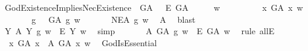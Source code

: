 \begin{isabellebody}
\isamarkupfalse%
\ GodExistenceImpliesNecExistence{\isacharcolon}\ {\isachardoublequoteopen}{\isasymlfloor}\isactrlbold {\isasymexists}\ G\isactrlsup A\ \isactrlbold {\isasymrightarrow}\ \ \isactrlbold {\isasymbox}\isactrlbold {\isasymexists}\isactrlsup E\ G\isactrlsup A{\isasymrfloor}{\isachardoublequoteclose}\isanewline
%
\isadelimproof
%
\endisadelimproof
%
\isatagproof
{}\isamarkupfalse%
\ {\isacharminus}\isanewline
\isacommand{{\isacharbraceleft}}\isamarkupfalse%
\isanewline
\ \ \isamarkupfalse%
\ w\ \isanewline
\ \ \isacommand{{\isacharbraceleft}}\isamarkupfalse%
\isanewline
\ \ \ \ \isamarkupfalse%
\ {\isachardoublequoteopen}{\isasymexists}x{\isachardot}\ G\isactrlsup A\ x\ w{\isachardoublequoteclose}\isanewline
\ \ \ \ \isamarkupfalse%
\ \isamarkupfalse%
\ g\ \ {}{\isacharcolon}\ {\isachardoublequoteopen}G\isactrlsup A\ g\ w{\isachardoublequoteclose}\ \isacommand{{\isachardot}{\isachardot}}\isamarkupfalse%
\isanewline
\ \ \ \ \isamarkupfalse%
\ {\isachardoublequoteopen}NE\isactrlsup A\ g\ w{\isachardoublequoteclose}\ \isamarkupfalse%
\ A{}\ \isamarkupfalse%
\ blast\ \ \ \ \ \ \ \ \ \ \ \ \ \ \ \ \ \ %
\isanewline
\ \ \ \ \isamarkupfalse%
\ {\isachardoublequoteopen}{\isasymforall}Y{\isachardot}\ {\isacharparenleft}{\isasymE}\isactrlsup A\ Y\ g\ w{\isacharparenright}\ {\isasymlongrightarrow}\ {\isacharparenleft}\isactrlbold {\isasymbox}\isactrlbold {\isasymexists}\isactrlsup E\ Y{\isacharparenright}\ w{\isachardoublequoteclose}\ \isamarkupfalse%
\ simp\isanewline
\ \ \ \ \isamarkupfalse%
\ {}{\isacharcolon}\ {\isachardoublequoteopen}{\isacharparenleft}{\isasymE}\isactrlsup A\ G\isactrlsup A\ g\ w{\isacharparenright}\ {\isasymlongrightarrow}\ {\isacharparenleft}\isactrlbold {\isasymbox}\isactrlbold {\isasymexists}\isactrlsup E\ G\isactrlsup A{\isacharparenright}\ w{\isachardoublequoteclose}\ \isamarkupfalse%
\ {\isacharparenleft}rule\ allE{\isacharparenright}\isanewline
\ \ \ \ \isamarkupfalse%
\ \ {\isachardoublequoteopen}{\isacharparenleft}\isactrlbold {\isasymforall}x{\isachardot}\ G\isactrlsup A\ x\ \isactrlbold {\isasymrightarrow}\ {\isacharparenleft}{\isasymE}\isactrlsup A\ G\isactrlsup A\ x{\isacharparenright}{\isacharparenright}\ w{\isachardoublequoteclose}\ \isamarkupfalse%
\ GodIsEssential\isanewline
\ \ \ \ \ \ \isamarkupfalse%

\end{isabellebody}
